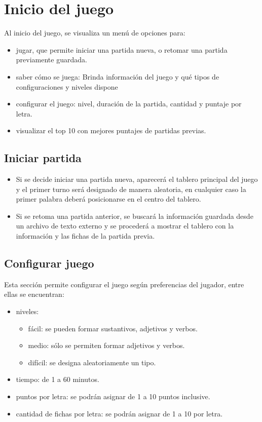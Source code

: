 \documentclass[11pt,fleqn]{book} %
\begin{document}
\section{Inicio del juego}
Al inicio del juego, se visualiza un menú de opciones para:
\begin{itemize}
\item jugar, que permite iniciar una partida nueva, o retomar una partida previamente guardada.
\item saber cómo se juega: Brinda información del juego y qué tipos de configuraciones y niveles dispone
\item configurar el juego: nivel, duración de la partida, cantidad y puntaje por letra.
\item visualizar el top 10 con mejores puntajes de partidas previas.
\end{itemize}

\subsection{Iniciar partida}
\begin{itemize}
\item Si se decide iniciar una partida nueva, aparecerá el tablero principal del juego y el primer turno será designado de manera aleatoria, en cualquier caso la primer palabra deberá posicionarse en el centro del tablero.

\item Si se retoma una partida anterior, se buscará la información guardada desde un archivo de texto externo y se procederá a mostrar el tablero con la información y las fichas de la partida previa. 
\end{itemize}

\subsection{Configurar juego}
Esta sección permite configurar el juego según preferencias del jugador, entre ellas se encuentran:
\begin{itemize}
    \item niveles:
        \begin{itemize}
            \item fácil: se pueden formar sustantivos, adjetivos y verbos.
            \item medio: sólo se permiten formar adjetivos y verbos.
            \item difícil: se designa aleatoriamente un tipo.
        \end{itemize}
    \item tiempo: de 1 a 60 minutos.
    \item puntos por letra: se podrán asignar de 1 a 10 puntos inclusive.
    \item cantidad de fichas por letra: se podrán asignar de 1 a 10 por letra.
\end{itemize}
\end{document}
